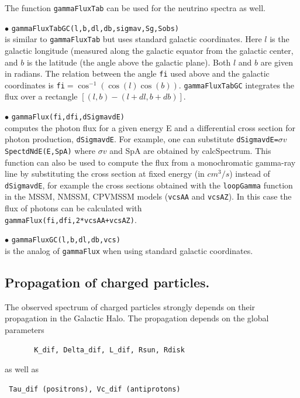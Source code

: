\documentclass[12pt,a4paper]{article}
\begin{document}
The function \verb|gammaFluxTab| can be used  for the neutrino spectra as well.

\noindent
$\bullet$ \verb|gammaFluxTabGC(l,b,dl,db,sigmav,Sg,Sobs)|\\
is similar to {\tt gammaFluxTab}  but uses standard galactic
coordinates. Here $l$ is  the galactic longitude (measured along the galactic   
equator from the galactic center, and $b$ is the latitude (the angle above the galactic    
plane). Both $l$ and $b$ are given in radians. The relation between the angle {\tt fi} used
above and the galactic coordinates is  {\tt fi}$=\cos^{-1}(\cos(l)\cos(b))$.  
 {\tt gammaFluxTabGC} integrates the flux over a     
rectangle $[(l,b) - (l+dl,b+db)]$. 


\noindent
$\bullet$ \verb|gammaFlux(fi,dfi,dSigmavdE)|\\
computes the photon flux for a given energy E and a differential cross section for photon production, \verb|dSigmavdE|. 
For example, one can substitute \verb|dSigmavdE=|$\sigma v$\verb|SpectdNdE(E,SpA)|
where $\sigma v$ and SpA are obtained by calcSpectrum. This function can also be used to compute the flux from a monochromatic gamma-ray line by substituting the cross section at fixed energy (in $cm^3/s$)  instead of \verb|dSigmavdE|, for example the cross sections obtained with the
\verb|loopGamma| function in  the   MSSM, NMSSM, CPVMSSM models (\verb|vcsAA| and \verb|vcsAZ|).
In this case the  flux of photons can be calculated with \\
\verb|gammaFlux(fi,dfi,2*vcsAA+vcsAZ)|.





\noindent
$\bullet$ \verb|gammaFluxGC(l,b,dl,db,vcs)|\\
is the analog of  \verb|gammaFlux| when using standard galactic coordinates.

\subsection{Propagation of charged particles.}

The observed spectrum of charged particles  strongly depends on their propagation
in the Galactic Halo. The propagation depends on the global parameters 
\begin{verbatim}
       K_dif, Delta_dif, L_dif, Rsun, Rdisk
\end{verbatim}
as well as 
\begin{verbatim}
 Tau_dif (positrons), Vc_dif (antiprotons)
\end{verbatim}
\end{document}
